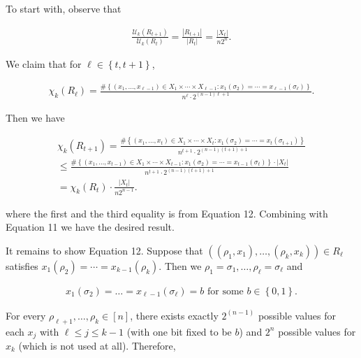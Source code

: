 \documentclass[10pt,a4paper]{article}
\begin{document}
To start with, observe that\par


\[\begin{gathered}
\frac{\mathcal{U}_{k}(R_{t+1})}{\mathcal{U}_{k}(R_{t})}=\frac{|R_{t+1}|}{|R_{t}|}=\frac{|X_{t}|}{n2^{n}}.
\end{gathered}\]


We claim that for $\ell\in\left\{t,t+1\right\}$,\par


\[\begin{gathered}
\chi_{k}(R_{\ell})=\frac{\#\left\{(x_{1},\dots,x_{\ell-1})\in X_{1}\times\cdots\times X_{\ell-1}:x_{1}(\sigma_{2})=\cdots=x_{\ell-1}(\sigma_{\ell})\right\}}{n^{\ell}\cdot 2^{(n-1)\ell+1}}.
\end{gathered}\]


Then we have\par


\[\begin{gathered}
\displaystyle\chi_{k}(R_{t+1}) \displaystyle=\frac{\#\left\{(x_{1},\dots,x_{t})\in X_{1}\times\cdots\times X_{t}:x_{1}(\sigma_{2})=\cdots=x_{t}(\sigma_{t+1})\right\}}{n^{t+1}\cdot 2^{(n-1)(t+1)+1}} \\
\displaystyle\leq\frac{\#\left\{(x_{1},\dots,x_{t-1})\in X_{1}\times\cdots\times X_{t-1}:x_{1}(\sigma_{2})=\cdots=x_{t-1}(\sigma_{t})\right\}\cdot\left|X_{t}\right|}{n^{t+1}\cdot 2^{(n-1)(t+1)+1}} \\
\displaystyle=\chi_{k}(R_{t})\cdot\frac{|X_{t}|}{n2^{n-1}}.
\end{gathered}\]


where the first and the third equality is from Equation 12.
Combining with Equation 11 we have the desired result.\par




It remains to show Equation 12.
Suppose that $((\rho_{1},x_{1}),\dots,(\rho_{k},x_{k}))\in R_{\ell}$
satisfies $x_{1}(\rho_{2})=\cdots=x_{k-1}(\rho_{k})$.
Then we $\rho_{1}=\sigma_{1},\dots,\rho_{\ell}=\sigma_{\ell}$ and\par


\[\begin{gathered}
x_{1}(\sigma_{2})=\dots=x_{\ell-1}(\sigma_{\ell})=b\text{ for some $b\in\left\{0,1\right\}$.}
\end{gathered}\]


For every $\rho_{\ell+1},\dots,\rho_{k}\in[n]$, there exists
exactly $2^{(n-1)}$ possible values for each $x_{j}$ with $\ell\leq j\leq k-1$ (with one bit fixed to be $b$) and $2^{n}$ possible values for $x_{k}$ (which is not used at all).
Therefore,\par
\end{document}
